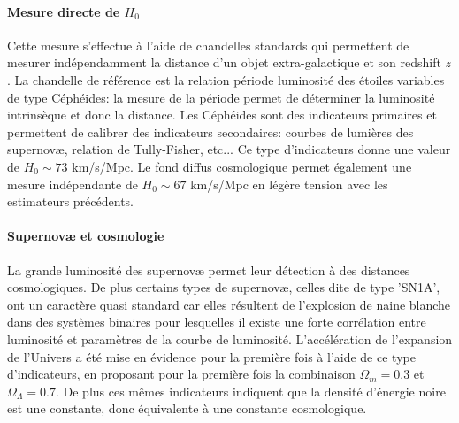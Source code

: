 \paragraph{Mesure directe de $H_0$}
Cette mesure s'effectue à l'aide de chandelles standards qui permettent de mesurer indépendamment la distance d'un objet extra-galactique et son redshift $z$. La chandelle de référence est la relation période luminosité des étoiles variables de type Céphéides: la mesure de la période permet de déterminer la luminosité intrinsèque et donc la distance. Les Céphéides sont des indicateurs primaires et permettent de calibrer des indicateurs secondaires: courbes de lumières des supernovæ, relation de Tully-Fisher, etc... Ce type d'indicateurs donne une valeur de $H_0\sim 73$ km/s/Mpc. Le fond diffus cosmologique permet également une mesure indépendante de $H_0\sim 67$ km/s/Mpc en légère tension avec les estimateurs précédents.

\paragraph{Supernovæ et cosmologie}
La grande luminosité des supernovæ permet leur détection à des distances cosmologiques. De plus certains types de supernovæ, celles dite de type 'SN1A', ont un caractère quasi standard car elles résultent de l'explosion de naine blanche dans des systèmes binaires pour lesquelles il existe une forte corrélation entre luminosité et paramètres de la courbe de luminosité. L'accélération de l'expansion de l'Univers a été mise en évidence pour la première fois à l'aide de ce type d'indicateurs, en proposant pour la première fois la combinaison $\Omega_m=0.3$ et $\Omega_\Lambda=0.7$. De plus ces mêmes indicateurs indiquent que la densité d'énergie noire est une constante, donc équivalente à une constante cosmologique.

